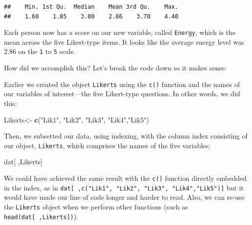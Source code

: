 \documentclass[
]{article}
\newenvironment{Shaded}{\begin{snugshade}}{\end{snugshade}}
\newcommand{\CommentTok}[1]{\textcolor[rgb]{0.56,0.35,0.01}{\textit{#1}}}
\newcommand{\KeywordTok}[1]{\textcolor[rgb]{0.13,0.29,0.53}{\textbf{#1}}}
\newcommand{\NormalTok}[1]{#1}
\newcommand{\OperatorTok}[1]{\textcolor[rgb]{0.81,0.36,0.00}{\textbf{#1}}}
\newcommand{\StringTok}[1]{\textcolor[rgb]{0.31,0.60,0.02}{#1}}
\begin{document}
\begin{Shaded}
\end{Shaded}

\begin{verbatim}
##    Min. 1st Qu.  Median    Mean 3rd Qu.    Max. 
##    1.60    1.85    3.00    2.86    3.70    4.40
\end{verbatim}

Each person now has a score on our new variable, called \texttt{Energy}, which is the mean across the five Likert-type items. It looks like the average energy level was 2.86 on the \texttt{1} to \texttt{5} scale.

How did we accomplish this? Let's break the code down so it makes sense:

Earlier we created the object \texttt{Likerts} using the \texttt{c()} function and the names of our variables of interest---the five Likert-type questions. In other words, we did this:

\begin{Shaded}
\begin{Highlighting}[]
\NormalTok{Likerts<-}\StringTok{ }\KeywordTok{c}\NormalTok{(}\StringTok{"Lik1"}\NormalTok{, }\StringTok{"Lik2"}\NormalTok{, }\StringTok{"Lik3"}\NormalTok{, }\StringTok{"Lik4"}\NormalTok{,}\StringTok{"Lik5"}\NormalTok{)}
\end{Highlighting}
\end{Shaded}

Then, we subsetted our data, using indexing, with the column index consisting of our object, \texttt{Likerts}, which comprises the names of the five variables:

\begin{Shaded}
\begin{Highlighting}[]
\NormalTok{dat[ ,Likerts]}
\end{Highlighting}
\end{Shaded}

We could have achieved the same result with the \texttt{c()} function directly embedded in the index, as in \texttt{dat{[}\ ,c("Lik1",\ "Lik2",\ "Lik3",\ "Lik4","Lik5"){]}} but it would have made our line of code longer and harder to read. Also, we can re-use the \texttt{Likerts} object when we perform other functions (such as \texttt{head(dat{[}\ ,Likerts{]})}).
\end{document}
